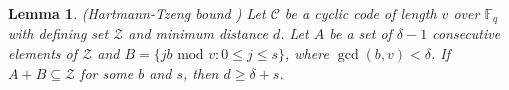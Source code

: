 \documentclass[pdflatex,sn-mathphys-num]{sn-jnl}%
\newtheorem{lemma}{Lemma}
\theoremstyle{thmstyleone}%
\theoremstyle{thmstyletwo}%
\theoremstyle{thmstylethree}%
\begin{document}
\vspace{0.5em}
\begin{lemma}\textnormal{(Hartmann-Tzeng bound \cite{Hartmann})}
    Let $\mathcal{C}$ be a cyclic code of length $v$ over $\mathbb{F}_{q}$ with defining set $\mathcal{Z}$ and minimum distance $d$. Let $A$ be a set of $\delta-1$ consecutive elements of $\mathcal{Z}$ and $B=\{jb\text{ mod $v$}:0\leq j\leq s\}$, where $\operatorname{gcd}(b,v)<\delta$. If $A+B\subseteq\mathcal{Z}$ for some $b$ and $s$, then $d\geq\delta+s$.
\end{lemma}
\end{document}
